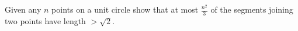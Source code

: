 Given any $n$ points on a unit circle show that at most $\frac{n^2}{3}$ of the segments joining two points have length $> \sqrt{2}$.